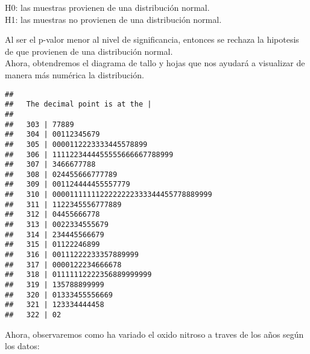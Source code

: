 \documentclass[]{article}
\newenvironment{Shaded}{\begin{snugshade}}{\end{snugshade}}
\newcommand{\KeywordTok}[1]{\textcolor[rgb]{0.13,0.29,0.53}{\textbf{#1}}}
\newcommand{\DataTypeTok}[1]{\textcolor[rgb]{0.13,0.29,0.53}{#1}}
\newcommand{\DecValTok}[1]{\textcolor[rgb]{0.00,0.00,0.81}{#1}}
\newcommand{\StringTok}[1]{\textcolor[rgb]{0.31,0.60,0.02}{#1}}
\newcommand{\OperatorTok}[1]{\textcolor[rgb]{0.81,0.36,0.00}{\textbf{#1}}}
\newcommand{\NormalTok}[1]{#1}
\begin{document}
H0: las muestras provienen de una distribución normal.\\
H1: las muestras no provienen de una distribución normal.

Al ser el p-valor menor al nivel de significancia, entonces se rechaza
la hipotesis de que provienen de una distribución normal.\\

Ahora, obtendremos el diagrama de tallo y hojas que nos ayudará a
visualizar de manera más numérica la distribución.

\begin{Shaded}
\end{Shaded}

\begin{verbatim}
## 
##   The decimal point is at the |
## 
##   303 | 77889
##   304 | 00112345679
##   305 | 0000112223333445578899
##   306 | 1111223444455555666667788999
##   307 | 3466677788
##   308 | 024455666777789
##   309 | 001124444455557779
##   310 | 0000111111122222222333344455778889999
##   311 | 1122345556777889
##   312 | 04455666778
##   313 | 0022334555679
##   314 | 234445566679
##   315 | 01122246899
##   316 | 00111222233357889999
##   317 | 0000122234666678
##   318 | 01111112222356889999999
##   319 | 135788899999
##   320 | 01333455556669
##   321 | 123334444458
##   322 | 02
\end{verbatim}

Ahora, observaremos como ha variado el oxido nitroso a traves de los
años según los datos:

\begin{Shaded}
\end{Shaded}
\end{document}
